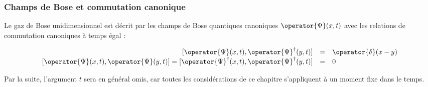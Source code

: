 
\subsubsection{Champs de Bose et commutation canonique}

Le gaz de Bose unidimensionnel est décrit par les champs de Bose quantiques canoniques \( \operator{\Psi}(x, t) \) avec les relations de commutation canoniques à temps égal :


\begin{eqnarray}
	\left . \begin{array}{rcl}
		[ \operator{\Psi}(x, t),  \operator{\Psi}^\dagger(y, t) ]  &=&  \operator{\delta}(x - y) \\
		\left [ \operator{\Psi}(x, t),  \operator{\Psi}(y, t) \right ]   =  [ \operator{\Psi}^\dag(x, t),  \operator{\Psi}^\dag(y, t) ]  &=&  0 
	\end{array} \right . \label{eq.1.1}
\end{eqnarray}

Par la suite, l'argument \( t \) sera en général omis, car toutes les considérations de ce chapitre s'appliquent à un moment fixe dans le temps.